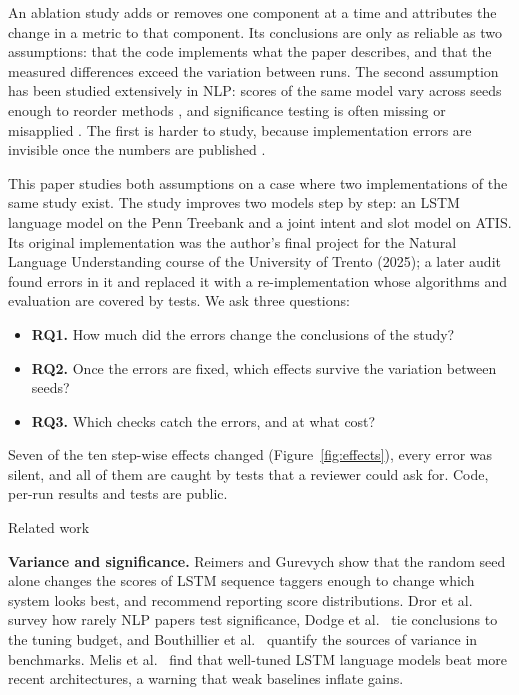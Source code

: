 \documentclass[10pt,twocolumn,a4paper]{article}
\makeatletter
\renewcommand\section{\@startsection{section}{1}{\z@}{-7pt plus -2pt minus -1pt}{3pt}%
  {\normalfont\normalsize\bfseries}}
\newenvironment{tightlist}{\begin{itemize}\setlength{\itemsep}{1pt}\setlength{\parskip}{0pt}%
  \setlength{\topsep}{2pt}\setlength{\leftmargin}{1.1em}}{\end{itemize}}
\newcommand{\para}[1]{\textbf{#1}\hspace{0.4em}}
\makeatother
\begin{document}
An ablation study adds or removes one component at a time and attributes the change in a metric to that
component. Its conclusions are only as reliable as two assumptions: that the code implements what the paper
describes, and that the measured differences exceed the variation between runs. The second assumption has been
studied extensively in NLP: scores of the same model vary across seeds enough to reorder methods
\cite{reimers2017distributions,melis2018evaluation,bouthillier2021variance}, and significance testing is often
missing or misapplied \cite{dror2018hitchhiker,dodge2019showyourwork}. The first is harder to study, because
implementation errors are invisible once the numbers are published \cite{sculley2015debt,lipton2019troubling}.

This paper studies both assumptions on a case where two implementations of the same study exist. The study
improves two models step by step: an LSTM language model on the Penn Treebank and a joint intent and slot model on
ATIS. Its original implementation was the author's final project for the Natural Language Understanding course of
the University of Trento (2025); a later audit found errors in it and replaced it with a re-implementation
whose algorithms and evaluation are covered by tests. We ask three questions:
\begin{tightlist}
  \item \textbf{RQ1.} How much did the errors change the conclusions of the study?
  \item \textbf{RQ2.} Once the errors are fixed, which effects survive the variation between seeds?
  \item \textbf{RQ3.} Which checks catch the errors, and at what cost?
\end{tightlist}
Seven of the ten step-wise effects changed (Figure~\ref{fig:effects}), every error was silent, and all of them are
caught by tests that a reviewer could ask for. Code, per-run results and tests are public.

\section{Related work}

\para{Variance and significance.} Reimers and Gurevych \cite{reimers2017distributions} show that the random seed
alone changes the scores of LSTM sequence taggers enough to change which system looks best, and recommend
reporting score distributions. Dror et
al.~\cite{dror2018hitchhiker} survey how rarely NLP papers test significance, Dodge et
al.~\cite{dodge2019showyourwork} tie conclusions to the tuning budget, and Bouthillier et
al.~\cite{bouthillier2021variance} quantify the sources of variance in benchmarks. Melis et
al.~\cite{melis2018evaluation} find that well-tuned LSTM language models beat more recent architectures, a warning
that weak baselines inflate gains.
\end{document}
